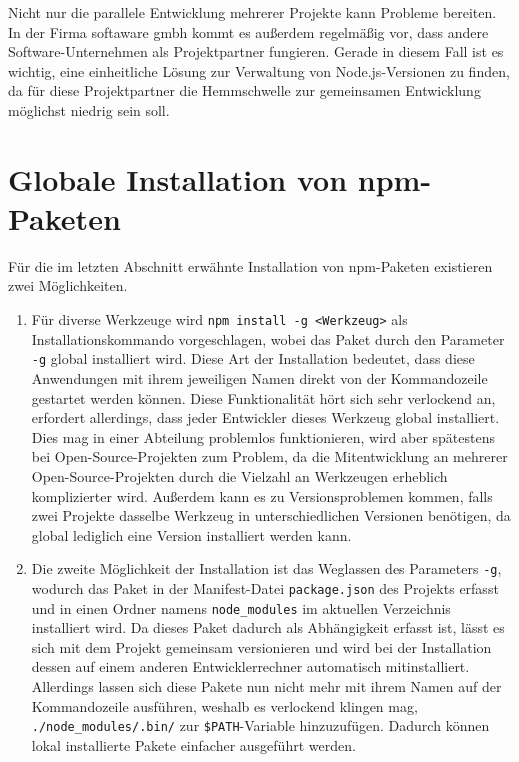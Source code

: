 Nicht nur die parallele Entwicklung mehrerer Projekte kann Probleme bereiten.
In der Firma softaware gmbh kommt es außerdem regelmäßig vor, dass andere Software-Unternehmen als Projektpartner fungieren.
Gerade in diesem Fall ist es wichtig, eine einheitliche Lösung zur Verwaltung von Node.js-Versionen zu finden, da für diese Projektpartner die Hemmschwelle zur gemeinsamen Entwicklung möglichst niedrig sein soll.


\section{Globale Installation von npm-Paketen}
\label{sec:global-package-installation}
Für die im letzten Abschnitt erwähnte Installation von npm-Paketen existieren zwei Möglichkeiten.

\begin{enumerate}
    \item Für diverse Werkzeuge wird \verb|npm install -g <Werkzeug>| als Installationskommando vorgeschlagen, wobei das Paket durch den Parameter \verb|-g| global installiert wird.
    Diese Art der Installation bedeutet, dass diese Anwendungen mit ihrem jeweiligen Namen direkt von der Kommandozeile gestartet werden können.
    Diese Funktionalität hört sich sehr verlockend an, erfordert allerdings, dass jeder Entwickler dieses Werkzeug global installiert.
    Dies mag in einer Abteilung problemlos funktionieren, wird aber spätestens bei Open-Source-Projekten zum Problem, da die Mitentwicklung an mehrerer Open-Source-Projekten durch die Vielzahl an Werkzeugen erheblich komplizierter wird.
    Außerdem kann es zu Versionsproblemen kommen, falls zwei Projekte dasselbe Werkzeug in unterschiedlichen Versionen benötigen, da global lediglich eine Version installiert werden kann.
\item Die zweite Möglichkeit der Installation ist das Weglassen des Parameters \verb|-g|, wodurch das Paket in der Manifest-Datei \verb|package.json| des Projekts erfasst und in einen Ordner namens \verb|node_modules| im aktuellen Verzeichnis installiert wird.
    Da dieses Paket dadurch als Abhängigkeit erfasst ist, lässt es sich mit dem Projekt gemeinsam versionieren und wird bei der Installation dessen auf einem anderen Entwicklerrechner automatisch mitinstalliert.
    Allerdings lassen sich diese Pakete nun nicht mehr mit ihrem Namen auf der Kommandozeile ausführen, weshalb es verlockend klingen mag, \verb|./node_modules/.bin/| zur \verb|$PATH|-Variable hinzuzufügen.
    Dadurch können lokal installierte Pakete einfacher ausgeführt werden.

\end{enumerate}
